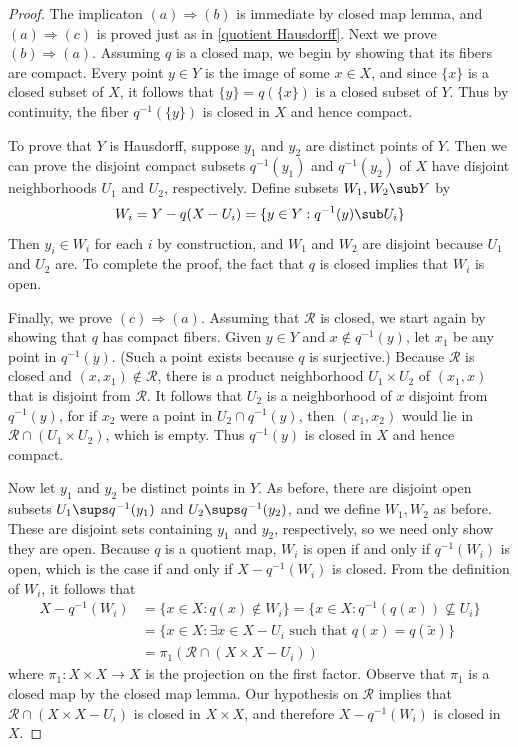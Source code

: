 \begin{proof}
The implicaton $(a)\Rightarrow(b)$ is immediate by closed map lemma, and $(a)\Rightarrow(c)$ is proved just as in \cref{quotient Hausdorff}. Next we prove $(b)\Rightarrow(a)$. Assuming $q$ is a closed map, we begin by showing that its fibers are compact. Every point $y\in Y$ is the image of some $x\in X$, and since $\{x\}$ is a closed subset of $X$, it follows that $\{y\}=q(\{x\})$ is a closed subset of $Y$. Thus by continuity, the fiber $q^{-1}(\{y\})$ is closed in $X$ and hence compact.\par 
To prove that $Y$ is Hausdorff, suppose $y_1$ and $y_2$ are distinct points of $Y$. Then we can prove the disjoint compact subsets $q^{-1}(y_1)$ and $q^{-1}(y_2)$ of $X$ have disjoint neighborhoods $U_1$ and $U_2$, respectively. Define subsets $W_1,W_2\sub Y$ by
\[W_i=Y-q(X-U_i)=\{y\in Y:q^{-1}(y)\sub U_i\}\]
Then $y_i\in W_i$ for each $i$ by construction, and $W_1$ and $W_2$ are disjoint because $U_1$ and $U_2$ are. To complete the proof, the fact that $q$ is closed implies that $W_i$ is open.\par
Finally, we prove $(c)\Rightarrow(a)$. Assuming that $\mathcal{R}$ is closed, we start again by showing that $q$ has compact fibers. Given $y\in Y$ and $x\notin q^{-1}(y)$, let $x_1$ be any point in $q^{-1}(y)$. (Such a point exists because $q$ is surjective.) Because $\mathcal{R}$ is closed and $(x,x_1)\notin\mathcal{R}$, there is a product neighborhood $U_1\times U_2$ of $(x_1,x)$ that is disjoint from $\mathcal{R}$. It follows that $U_2$ is a neighborhood of $x$ disjoint from $q^{-1}(y)$, for if $x_2$ were a point in $U_2\cap q^{-1}(y)$, then $(x_1,x_2)$ would lie in $\mathcal{R}\cap(U_1\times U_2)$, which is empty. Thus $q^{-1}(y)$ is closed in $X$ and hence compact.\par
Now let $y_1$ and $y_2$ be distinct points in $Y$. As before, there are disjoint open
subsets $U_1\sups q^{-1}(y_1)$ and $U_2\sups q^{-1}(y_2)$, and we define $W_1,W_2$ as before. These are disjoint sets containing $y_1$ and $y_2$, respectively, so we need only show they are open. Because $q$ is a quotient map, $W_i$ is open if and only if $q^{-1}(W_i)$ is open, which is the case if and only if $X-q^{-1}(W_i)$ is closed. From the definition of $W_i$, it follows that
\begin{align*}
X-q^{-1}(W_i)&=\{x\in X:q(x)\notin W_i\}=\{x\in X:q^{-1}(q(x))\nsubseteq U_i\}\\
&=\{x\in X:\text{$\exists x\in X-U_i$ such that $q(x)=q(\tilde{x})$}\}\\
&=\pi_1(\mathcal{R}\cap(X\times X-U_i))
\end{align*}
where $\pi_1:X\times X\to X$ is the projection on the first factor. Observe that $\pi_1$ is a closed map by the closed map lemma. Our hypothesis on $\mathcal{R}$ implies that $\mathcal{R}\cap(X\times X-U_i)$ is closed in $X\times X$, and therefore $X-q^{-1}(W_i)$ is closed in $X$.
\end{proof}
